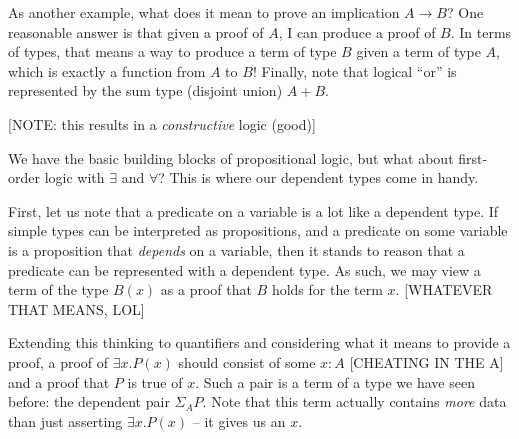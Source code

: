 \begin{table}[h!]
\centering
{}%
\hspace{.25\linewidth}
\end{table}

As another example, what does it mean to prove an implication $A \rightarrow B$?
One reasonable answer is that given a proof of $A$, I can produce a proof of
$B$. In terms of types, that means a way to produce a term of type $B$ given a
term of type $A$, which is exactly a function from $A$ to $B$! Finally, note
that logical ``or'' is represented by the sum type (disjoint union) $A + B$.

[NOTE: this results in a \emph{constructive} logic (good)]

We have the basic building blocks of propositional logic, but what about
first-order logic with $\exists$ and $\forall$? This is where our dependent
types come in handy.

First, let us note that a predicate on a variable is a lot like a dependent
type. If simple types can be interpreted as propositions, and a predicate on
some variable is a proposition that \emph{depends} on a variable, then it stands
to reason that a predicate can be represented with a dependent type. As such, we
may view a term of the type $B(x)$ as a proof that $B$ holds for the term $x$.
[WHATEVER THAT MEANS, LOL]

Extending this thinking to quantifiers and considering what it means to provide
a proof, a proof of $\exists x. P(x)$ should consist of some $x:A$ [CHEATING IN
THE A] and a proof that $P$ is true of $x$. Such a pair is a term of a type we have seen
before: the dependent pair $\Sigma_A P$. Note that this term actually contains
\emph{more} data than just asserting $\exists x. P(x)$ -- it gives us an $x$.

